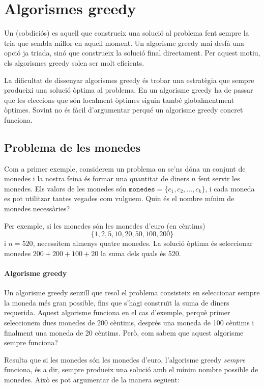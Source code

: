 \chapter{Algorismes greedy}


Un  (cobdiciós)
es aquell que construeix una solució al problema
fent sempre la tria que sembla
millor en aquell moment.
Un algorisme greedy mai desfà una opció
ja triada, sinó que construeix la solució
final directament.
Per aquest motiu, els algorismes greedy
solen ser molt eficients.

La dificultat de dissenyar algorismes greedy
és trobar una estratègia
que sempre produeixi una solució òptima
al problema.
En un algorisme greedy ha de passar que les eleccions
que són localment òptimes siguin també globalmentment òptimes.
Sovint no és fàcil d'argumentar perqué un algorisme greedy
concret funciona.

\section{Problema de les monedes}

Com a primer exemple, considerem un problema
on se'ns dóna un conjunt de monedes
i la nostra feina és formar una quantitat de diners $n$
fent servir les monedes.
Els valors de les monedes són
$\texttt{monedes}=\{c_1,c_2,\ldots,c_k\}$,
i cada moneda es pot utilitzar tantes vegades com vulguem.
Quin és el nombre mínim de monedes necessàries?

Per exemple, si les monedes són les monedes d'euro (en cèntims)
\[\{1,2,5,10,20,50,100,200\}\]
i $n=520$,
necessitem almenys quatre monedes.
La solució òptima és seleccionar monedes
$200+200+100+20$ la suma dels quals és 520.

\subsubsection{Algorisme greedy}

Un algorisme greedy senzill que resol el problema consisteix
en seleccionar sempre la moneda més gran possible,
fins que s'hagi construït la suma de diners requerida.
Aquest algorisme funciona en el cas d'exemple,
perquè primer seleccionem dues monedes de 200 cèntims,
després una moneda de 100 cèntims i finalment una moneda de 20 cèntims.
Però, com sabem que aquest algorisme sempre funciona?

Resulta que si les monedes són les monedes d'euro,
l'algorisme greedy \emph{sempre} funciona, és a dir,
sempre produeix una solució amb el mínim
nombre possible de monedes.
Això es pot argumentar de la manera següent:

